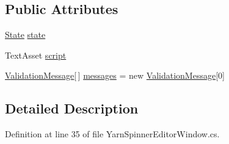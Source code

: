 \subsection*{Public Attributes}
\begin{DoxyCompactItemize}
\item 
\hyperlink{a00049_ab24848d7951ce44eb3c7768c6ee10385}{State} \hyperlink{a00049_a7202b24bd068da24d7e28bec5668b13a}{state}
\item 
Text\-Asset \hyperlink{a00049_a6c852f7521c0a91b519aa3d391f63e6b}{script}
\item 
\hyperlink{a00186_a00383}{Validation\-Message}\mbox{[}$\,$\mbox{]} \hyperlink{a00049_a808a039e280cf875cb3c9e9385148498}{messages} = new \hyperlink{a00186_a00383}{Validation\-Message}\mbox{[}0\mbox{]}
\end{DoxyCompactItemize}


\subsection{Detailed Description}


Definition at line 35 of file Yarn\-Spinner\-Editor\-Window.\-cs.



